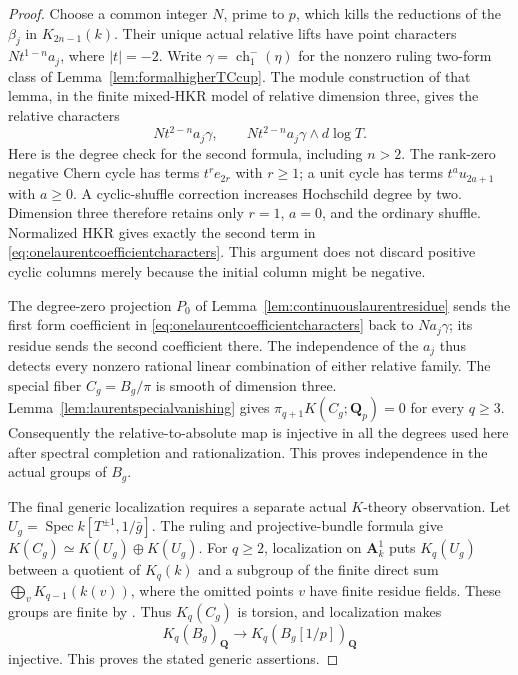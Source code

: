 \documentclass[11pt,a4paper]{article}
\theoremstyle{remark}
\newcommand{\Q}{\mathbf Q}
\newcommand{\A}{\mathbf A}
\newcommand{\Spec}{\operatorname{Spec}}
\begin{document}
\begin{proof}
Choose a common integer $N$, prime to $p$, which kills the
reductions of the $\beta_j$ in $K_{2n-1}(k)$.
Their unique actual relative lifts have point characters
$Nt^{1-n}a_j$, where $|t|=-2$.
Write $\gamma=\operatorname{ch}^-_1(\eta)$ for the nonzero ruling
two-form class of Lemma~\ref{lem:formalhigherTCcup}.
The module construction of that lemma, in the finite mixed-HKR
model of relative dimension three, gives the relative characters
\begin{equation}\label{eq:onelaurentcoefficientcharacters}
 Nt^{2-n}a_j\gamma,\qquad
 Nt^{2-n}a_j\gamma\wedge d\log T.
\end{equation}
Here is the degree check for the second formula, including $n>2$.
The rank-zero negative Chern cycle has terms $t^r e_{2r}$ with
$r\geq1$; a unit cycle has terms $t^a u_{2a+1}$ with $a\geq0$.
A cyclic-shuffle correction increases Hochschild degree by two.
Dimension three therefore retains only $r=1$, $a=0$, and the
ordinary shuffle. Normalized HKR gives exactly the second term
in \eqref{eq:onelaurentcoefficientcharacters}.
This argument does not discard positive cyclic columns
merely because the initial column might be negative.

The degree-zero projection $P_0$ of
Lemma~\ref{lem:continuouslaurentresidue} sends the first form
coefficient in \eqref{eq:onelaurentcoefficientcharacters}
back to $Na_j\gamma$; its residue sends the second coefficient there.
The independence of the $a_j$ thus detects every nonzero rational
linear combination of either relative family.
The special fiber $C_g=B_g/\pi$ is smooth of dimension three.
Lemma~\ref{lem:laurentspecialvanishing} gives
$\pi_{q+1}K(C_g;\Q_p)=0$ for every $q\geq3$.
Consequently the relative-to-absolute map is injective in all the
degrees used here after spectral completion and rationalization.
This proves independence in the actual groups of $B_g$.

The final generic localization requires a separate actual
$K$-theory observation. Let
$U_g=\Spec k[T^{\pm1},1/\bar g]$.
The ruling and projective-bundle formula give
$K(C_g)\simeq K(U_g)\oplus K(U_g)$.
For $q\geq2$, localization on $\A^1_k$ puts $K_q(U_g)$ between
a quotient of $K_q(k)$ and a subgroup of the finite direct sum
$\bigoplus_vK_{q-1}(k(v))$, where the omitted points $v$ have
finite residue fields. These groups are finite by \cite{Quillen}.
Thus $K_q(C_g)$ is torsion, and localization makes
\[
 K_q(B_g)_{\Q}\longrightarrow K_q(B_g[1/p])_{\Q}
\]
injective. This proves the stated generic assertions.
\end{proof}
\end{document}
